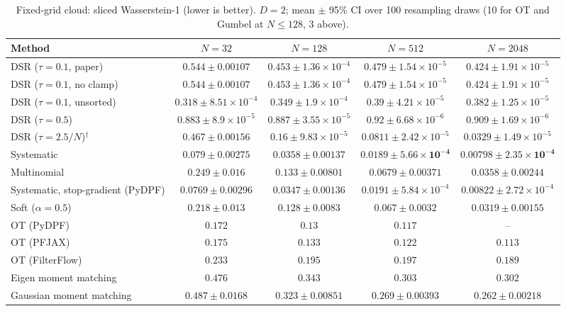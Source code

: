 \begin{table}[H]
\centering
\small
\caption{Fixed-grid cloud: sliced Wasserstein-1 (lower is better). $D{=}2$; mean $\pm$ 95\% CI over 100 resampling draws (10 for OT and Gumbel at $N\le128$, 3 above).}
\label{tab:static-fixed-sliced_w1}
\begin{adjustbox}{max width=\linewidth}
\begin{tabular}{lcccc}
\toprule
Method & $N{=}32$ & $N{=}128$ & $N{=}512$ & $N{=}2048$ \\
\midrule
DSR ($\tau{=}0.1$, paper) & $0.544\pm0.00107$ & $0.453\pm1.36\times10^{-4}$ & $0.479\pm1.54\times10^{-5}$ & $0.424\pm1.91\times10^{-5}$ \\
DSR ($\tau{=}0.1$, no clamp) & $0.544\pm0.00107$ & $0.453\pm1.36\times10^{-4}$ & $0.479\pm1.54\times10^{-5}$ & $0.424\pm1.91\times10^{-5}$ \\
DSR ($\tau{=}0.1$, unsorted) & $0.318\pm8.51\times10^{-4}$ & $0.349\pm1.9\times10^{-4}$ & $0.39\pm4.21\times10^{-5}$ & $0.382\pm1.25\times10^{-5}$ \\
DSR ($\tau{=}0.5$) & $0.883\pm8.9\times10^{-5}$ & $0.887\pm3.55\times10^{-5}$ & $0.92\pm6.68\times10^{-6}$ & $0.909\pm1.69\times10^{-6}$ \\
DSR ($\tau{=}2.5/N$)$^\dagger$ & $0.467\pm0.00156$ & $0.16\pm9.83\times10^{-5}$ & $0.0811\pm2.42\times10^{-5}$ & $0.0329\pm1.49\times10^{-5}$ \\
\midrule
Systematic & $0.079\pm0.00275$ & $0.0358\pm0.00137$ & $\mathbf{0.0189\pm5.66\times10^{-4}}$ & $\mathbf{0.00798\pm2.35\times10^{-4}}$ \\
Multinomial & $0.249\pm0.016$ & $0.133\pm0.00801$ & $0.0679\pm0.00371$ & $0.0358\pm0.00244$ \\
Systematic, stop-gradient (PyDPF) & $\mathbf{0.0769\pm0.00296}$ & $\mathbf{0.0347\pm0.00136}$ & $0.0191\pm5.84\times10^{-4}$ & $0.00822\pm2.72\times10^{-4}$ \\
Soft ($\alpha{=}0.5$) & $0.218\pm0.013$ & $0.128\pm0.0083$ & $0.067\pm0.0032$ & $0.0319\pm0.00155$ \\
OT (PyDPF) & $0.172$ & $0.13$ & $0.117$ & -- \\
OT (PFJAX) & $0.175$ & $0.133$ & $0.122$ & $0.113$ \\
OT (FilterFlow) & $0.233$ & $0.195$ & $0.197$ & $0.189$ \\
Eigen moment matching & $0.476$ & $0.343$ & $0.303$ & $0.302$ \\
Gaussian moment matching & $0.487\pm0.0168$ & $0.323\pm0.00851$ & $0.269\pm0.00393$ & $0.262\pm0.00218$ \\

\end{tabular}
\end{adjustbox}
\end{table}
